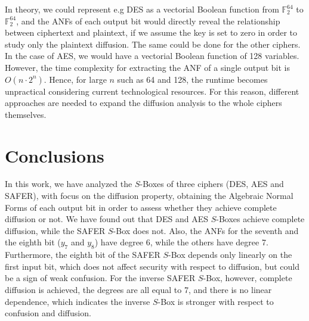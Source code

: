 \documentclass{report}
\begin{document}
In theory, we could represent e.g DES as a vectorial Boolean function from $\mathbb{F}^{64}_2$ to $\mathbb{F}^{64}_2$, and the ANFs of each output bit would directly reveal the relationship between ciphertext and plaintext, if we assume the key is set to zero in order to study only the plaintext diffusion. The same could be done for the other ciphers. In the case of AES, we would have a vectorial Boolean function of 128 variables. However, the time complexity for extracting the ANF of a single output bit is $O(n \cdot 2^{n})$. Hence, for large $n$ such as 64 and 128, the runtime becomes unpractical considering current technological resources. For this reason, different approaches are needed to expand the diffusion analysis to the whole ciphers themselves.

\section{Conclusions}

In this work, we have analyzed the $S$-Boxes of three ciphers (DES, AES and SAFER), with focus on the diffusion property, obtaining the Algebraic Normal Forms of each output bit in order to assess whether they achieve complete diffusion or not. We have found out that DES and AES $S$-Boxes achieve complete diffusion, while the SAFER $S$-Box does not. Also, the ANFs for the seventh and the eighth bit ($y_7$ and $y_8$) have degree 6, while the others have degree 7. Furthermore, the eighth bit of the SAFER $S$-Box depends only linearly on the first input bit, which does not affect security with respect to diffusion, but could be a sign of weak confusion. For the inverse SAFER $S$-Box, however, complete diffusion is achieved, the degrees are all equal to 7, and there is no linear dependence, which indicates the inverse $S$-Box is stronger with respect to confusion and diffusion.



\end{document}
